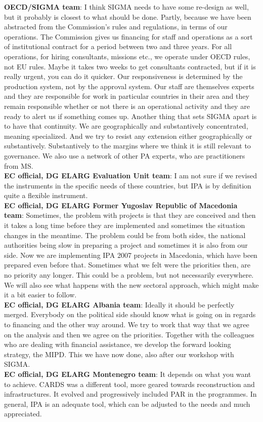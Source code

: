 \textbf{OECD/SIGMA team}: I think SIGMA needs to have some re-design as well, but it probably is closest to what should be done. Partly, because we have been abstracted from the Commission's rules and regulations, in terms of our operations. The Commission gives us financing for staff and operations as a sort of institutional contract for a period between two and three years. For all operations, for hiring consultants, missions etc., we operate under OECD rules, not EU rules. Maybe it takes two weeks to get consultants contracted, but if it is really urgent, you can do it quicker. Our responsiveness is determined by the production system, not by the approval system. Our staff are themselves experts and they are responsible for work in particular countries in their area and they remain responsible whether or not there is an operational activity and they are ready to alert us if something comes up. Another thing that sets SIGMA apart is to have that continuity. We are geographically and substantively concentrated, meaning specialized. And we try to resist any extension either geographically or substantively. Substantively to the margins where we think it is still relevant to governance. We also use a network of other PA experts, who are practitioners from MS.\\
\textbf{EC official, DG ELARG Evaluation Unit team}: I am not sure if we revised the instruments in the specific needs of these countries, but IPA is by definition quite a flexible instrument.\\
\textbf{EC official, DG ELARG Former Yugoslav Republic of Macedonia team}: Sometimes, the problem with projects is that they are conceived and then it takes a long time before they are implemented and sometimes the situation changes in the meantime. The problem could be from both sides, the national authorities being slow in preparing a project and sometimes it is also from our side. Now we are implementing IPA 2007 projects in Macedonia, which have been prepared even before that. Sometimes what we felt were the priorities then, are no priority any longer. This could be a problem, but not necessarily everywhere. We will also see what happens with the new sectoral approach, which might make it a bit easier to follow.\\
\textbf{EC official, DG ELARG Albania team}: Ideally it should be perfectly merged. Everybody on the political side should know what is going on in regards to financing and the other way around. We try to work that way that we agree on the analysis and then we agree on the priorities. Together with the colleagues who are dealing with financial assistance, we develop the forward looking strategy, the MIPD. This we have now done, also after our workshop with SIGMA.\\
\textbf{EC official, DG ELARG Montenegro team}: It depends on what you want to achieve. CARDS was a different tool, more geared towards reconstruction and infrastructures. It evolved and progressively included PAR in the programmes.  In general, IPA is an adequate tool, which can be adjusted to the needs and much appreciated.\\
